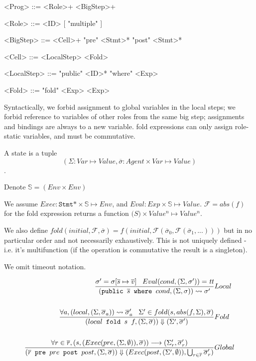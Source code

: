 \documentclass[acmsmall,review,anonymous]{acmart}\settopmatter{printfolios=true}
\begin{document}
\begin{grammar}
	<Prog>      ::= <Role>+ <BigStep>+

	<Role>		::= <ID> [ "multiple" ]

	<BigStep>   ::= <Cell>+ "pre" <Stmt>* "post" <Stmt>*

	<Cell> 		::= <LocalStep> <Fold>

	<LocalStep> ::= "public" <ID>* "where" <Exp>
	
	<Fold>      ::= "fold" <Exp> <Exp>
\end{grammar}

Syntactically, we forbid assignment to global variables in the local steps;
we forbid reference to variables of other roles from the same big step;
assignments and bindings are always to a new variable.
fold expressions can only assign role-static variables, and must be commutative.

A state is a tuple 
\[
	(\Sigma: Var \mapsto Value, \overline{\sigma}: Agent \times Var \mapsto Value )
\].

Denote $\mathbb{S} = (Env \times Env)$


\newcommand{\G}{\Sigma}
\newcommand{\s}{\sigma}
\newcommand{\R}{\overline{\s}}

We assume $Exec: \texttt{Stmt*} \times \mathbb{S} \mapsto Env $, and $Eval: Exp \times \mathbb{S} \mapsto Value$.
$\mathcal{F} = abs(f)$ for the fold expression returns a function $\mathbb(S) \times Value^n \mapsto Value^n$.

We also define $fold(initial, \mathcal{F}, \R)= f(initial, \mathcal{F}(\R_0, \mathcal{F}(\R_1, ...)))$ but in no particular order and not necessarily exhaustively.
This is not uniquely defined - i.e. it's multifunction (if the operation is commutative the result is a singleton).

We omit timeout notation.

\begin{align*}
	\judge{&Local}{
		\s' = \s[\overline{s} \mapsto \overline{v}] \;\;\;
		Eval(cond, (\G, \s')) = \emph{tt}
	}{
		(\texttt{public }\overline{s} \texttt{ where } cond, (\G, \s)) \rightsquigarrow \s'
	}\\
	\\
	\judge{&Fold}{
		\forall a, (local, (\G, \R_a)) \rightsquigarrow \R'_a \;\;\;
		\G' \in fold(s, abs(f, \G), \R)
	}{
		(local \texttt{ fold } s \texttt{ } f, (\G, \R)) \Downarrow (\G', \R')
	}\\
	\\
	\judge{&Global}{
		\forall r \in \overline{r}, (s, (Exec(pre, (\G, \emptyset)), \R)) \longrightarrow (\G'_r, \R'_r)
	}{
		(\overline{r} \texttt{ pre } pre \texttt{ post } post, (\G, \R))
		\Downarrow (Exec(post, (\G', \emptyset)), \bigcup_{r\in \overline{r}} \R'_r)
	}
\end{align*}
\end{document}
